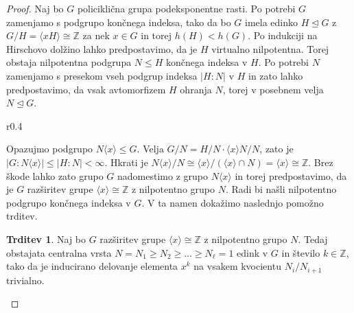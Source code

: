 \documentclass[11pt]{book}
\def\ZZ{\mathbb{Z}}
\theoremstyle{definition}
\theoremstyle{zgled}
\theoremstyle{odprtproblem}
\theoremstyle{domacanaloga}
\newenvironment{dokaz}
    {\color{siva}\begin{proof}}
    {\end{proof}}
\theoremstyle{izrek}
\newtheorem*{trditev}{Trditev}
\begin{document}
\begin{dokaz}
Naj bo $G$ policiklična grupa podeksponentne rasti. Po potrebi $G$ zamenjamo s podgrupo končnega indeksa, tako da bo $G$ imela edinko $H \unlhd G$ z $G/H = \langle x H \rangle \cong \ZZ$ za nek $x \in G$ in torej $h(H) < h(G)$. Po indukciji na Hirschovo dolžino lahko predpostavimo, da je $H$ virtualno nilpotentna. Torej obstaja nilpotentna podgrupa $N \leq H$ končnega indeksa v $H$. Po potrebi $N$ zamenjamo s presekom vseh podgrup indeksa $|H:N|$ v $H$ in zato lahko predpostavimo, da vsak avtomorfizem $H$ ohranja $N$, torej v posebnem velja $N \unlhd G$.

\begin{wrapfigure}{r}{0.4\textwidth}
\centering
{}
\end{wrapfigure}

Opazujmo podgrupo $N \langle x \rangle \leq G$. Velja $G/N = H/N \cdot \langle x \rangle N/N$, zato je $|G:N\langle x \rangle| \leq |H:N| < \infty$. Hkrati je $N\langle x \rangle/N \cong \langle x \rangle/(\langle x \rangle \cap N) = \langle x \rangle \cong \ZZ$. Brez škode lahko zato grupo $G$ nadomestimo z grupo $N \langle x \rangle$ in torej predpostavimo, da je $G$ razširitev grupe $\langle x \rangle \cong \ZZ$ z nilpotentno grupo $N$. Radi bi našli nilpotentno podgrupo končnega indeksa v $G$. V ta namen dokažimo naslednjo pomožno trditev.

\begin{trditev}
Naj bo $G$ razširitev grupe $\langle x \rangle \cong \ZZ$ z nilpotentno grupo $N$.
Tedaj obstajata centralna vrsta $N = N_1 \geq N_2 \geq \dots \geq N_\ell = 1$ edink v $G$ in število $k \in \ZZ$, tako da je inducirano delovanje elementa $x^k$ na vsakem kvocientu $N_i/N_{i+1}$ trivialno. 
\end{trditev}


\end{dokaz}
\end{document}
